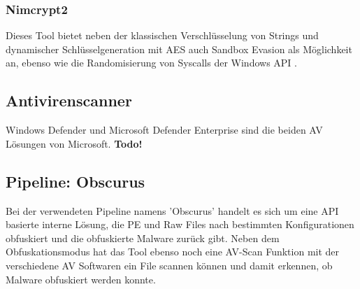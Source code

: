     \subsubsection{Nimcrypt2}
    Dieses Tool bietet neben der klassischen Verschlüsselung von Strings und dynamischer Schlüsselgeneration mit AES auch Sandbox Evasion als Möglichkeit an, ebenso wie die Randomisierung von Syscalls der Windows API \cite{icyguider_2022_github}.

    
\subsection{Antivirenscanner}
Windows Defender und Microsoft Defender Enterprise sind die beiden AV Lösungen von Microsoft.  
\textbf{Todo!}

\subsection{Pipeline: Obscurus}
Bei der verwendeten Pipeline namens 'Obscurus' handelt es sich um eine API basierte interne Lösung, die PE und Raw Files nach bestimmten Konfigurationen obfuskiert und die obfuskierte Malware zurück gibt. Neben dem Obfuskationsmodus hat das Tool ebenso noch eine AV-Scan Funktion mit der verschiedene AV Softwaren ein File scannen können und damit erkennen, ob Malware obfuskiert werden konnte.